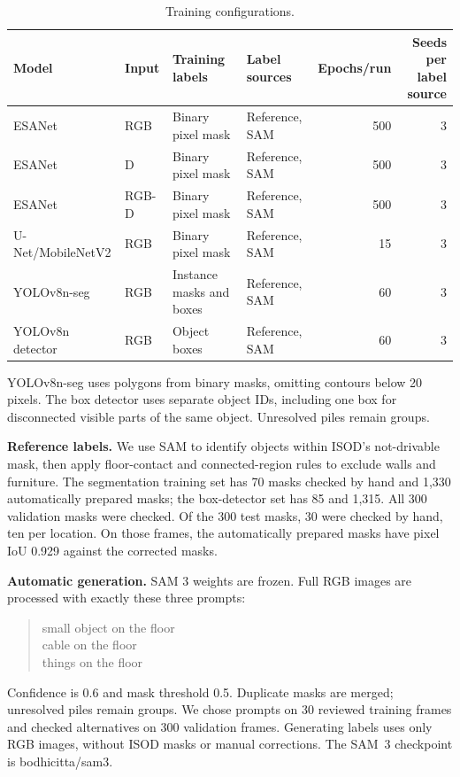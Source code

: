 \begin{table}[H]
\caption{Training configurations.}
\label{tab:experiment-matrix}
\centering\small
\begin{tabular}{llllrr}
\toprule
Model & Input & Training labels & Label sources & Epochs/run & \shortstack{Seeds per\\label source}\\
\midrule
ESANet & RGB & Binary pixel mask & Reference, SAM & 500 & 3\\
ESANet & D & Binary pixel mask & Reference, SAM & 500 & 3\\
ESANet & RGB-D & Binary pixel mask & Reference, SAM & 500 & 3\\
U-Net/MobileNetV2 & RGB & Binary pixel mask & Reference, SAM & 15 & 3\\
YOLOv8n-seg & RGB & Instance masks and boxes & Reference, SAM & 60 & 3\\
YOLOv8n detector & RGB & Object boxes & Reference, SAM & 60 & 3\\
\bottomrule
\end{tabular}
\end{table}

YOLOv8n-seg uses polygons from binary masks, omitting contours below
20 pixels. The box detector uses separate object IDs, including one box
for disconnected visible parts of the same object. Unresolved piles
remain groups.

\textbf{Reference labels.} We use SAM to identify objects within ISOD's
not-drivable mask, then apply floor-contact and connected-region rules
to exclude walls and furniture. The segmentation training set has
70 masks checked by hand and 1,330 automatically prepared masks; the
box-detector set has 85 and 1,315. All 300 validation masks were checked.
Of the 300 test masks, 30 were checked by hand, ten per location. On
those frames, the automatically prepared masks have pixel IoU 0.929
against the corrected masks.

\textbf{Automatic generation.} SAM 3 weights are frozen. Full RGB images
are processed with exactly these three prompts:
\begin{quote}
small object on the floor\\
cable on the floor\\
things on the floor
\end{quote}
Confidence is 0.6 and mask threshold 0.5. Duplicate masks are merged;
unresolved piles remain groups. We chose prompts on 30 reviewed training
frames and checked alternatives on 300 validation frames. Generating
labels uses only RGB images, without ISOD masks or manual corrections.
The SAM~3 checkpoint is \textnormal{bodhicitta/sam3}.

